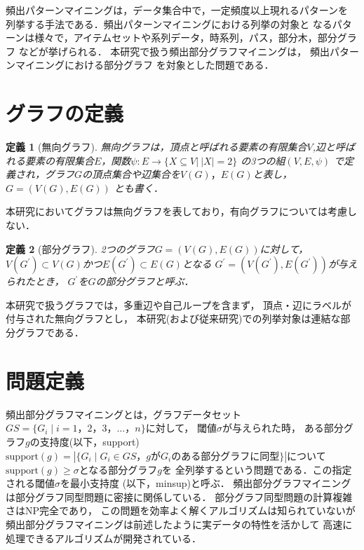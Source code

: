 \documentclass[12pt,fleqn]{jsotsuron}
\newtheorem{Definition}{定義}
\begin{document}
頻出パターンマイニングは，データ集合中で，一定頻度以上現れるパターンを
列挙する手法である．頻出パターンマイニングにおける列挙の対象と
なるパターンは様々で，アイテムセットや系列データ，時系列，パス，部分木，部分グラフ
などが挙げられる．
本研究で扱う頻出部分グラフマイニングは，
頻出パターンマイニングにおける部分グラフ
を対象とした問題である．

\section{グラフの定義}

\begin{Definition}[無向グラフ]
無向グラフは，頂点と呼ばれる要素の有限集合$V$,辺と呼ばれる要素の有限集合$E$，関数$\psi : E \rightarrow \{X ⊆ V |\ |X| = 2\} $
の3つの組$(V, E, \psi)$ で定義され，グラフ$G$の頂点集合や辺集合を$V(G)，E(G)$と表し，$G=(V(G),E(G))$
とも書く．
\end{Definition}

本研究においてグラフは無向グラフを表しており，有向グラフについては考慮しない．

\begin{Definition}[部分グラフ]
2つのグラフ$G=(V(G),E(G))$に対して，
$V(G^{\prime })\subset V(G)$かつ$E(G^{\prime })\subset E(G)$となる
$G^{\prime } =(V(G^{\prime }),E(G^{\prime }))$が与えられたとき，
$G^{\prime }$を$G$の部分グラフと呼ぶ．
\end{Definition}

本研究で扱うグラフでは，多重辺や自己ループを含まず，
頂点・辺にラベルが付与された無向グラフとし，
本研究(および従来研究)での列挙対象は連結な部分グラフである．

\section{問題定義}
頻出部分グラフマイニングとは，グラフデータセット
$GS=\{G_i \mid i=1，2，3，\ldots ，n\}$に対して，
閾値$\sigma$が与えられた時，
ある部分グラフ$g$の支持度(以下，support)
$\mathrm{support}(g)=|\{G_i \mid G_i\in GS，gが
G_iのある部分グラフに同型\}|$について
$\mathrm{support}(g)\geq \sigma$となる部分グラフ$g$を
全列挙するという問題である．この指定される閾値$\sigma$を最小支持度
(以下，minsup)と呼ぶ．
頻出部分グラフマイニングは部分グラフ同型問題に密接に関係している．
部分グラフ同型問題の計算複雑さはNP完全であり，
この問題を効率よく解くアルゴリズムは知られていない\cite{gi}が
頻出部分グラフマイニングは前述したように実データの特性を活かして
高速に処理できるアルゴリズムが開発されている．
\end{document}
